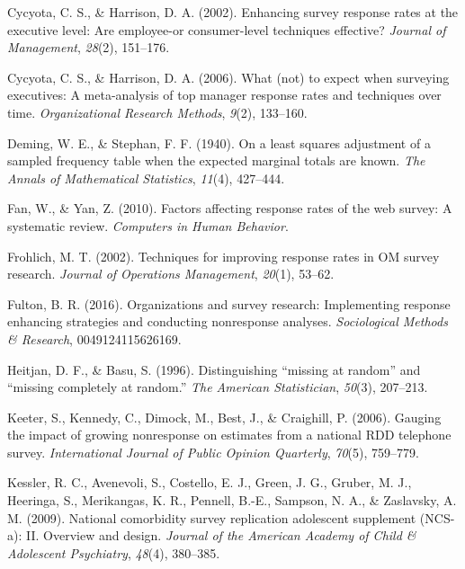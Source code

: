 \documentclass[
  man,mask]{apa7}
\newlength{\cslhangindent}
\newlength{\cslentryspacingunit} %
\newenvironment{CSLReferences}[2] %
 {%
  \setlength{\parindent}{0pt}
  \ifodd #1
  \let\oldpar\par
  \def\par{\hangindent=\cslhangindent\oldpar}
  \fi
  \setlength{\parskip}{#2\cslentryspacingunit}
 }%
 {}
\begin{document}
\begin{CSLReferences}{1}{0}
\leavevmode{}%
Cycyota, C. S., \& Harrison, D. A. (2002). Enhancing survey response rates at the executive level: Are employee-or consumer-level techniques effective? \emph{Journal of Management}, \emph{28}(2), 151--176.

\leavevmode{}%
Cycyota, C. S., \& Harrison, D. A. (2006). What (not) to expect when surveying executives: A meta-analysis of top manager response rates and techniques over time. \emph{Organizational Research Methods}, \emph{9}(2), 133--160.

\leavevmode{}%
Deming, W. E., \& Stephan, F. F. (1940). On a least squares adjustment of a sampled frequency table when the expected marginal totals are known. \emph{The Annals of Mathematical Statistics}, \emph{11}(4), 427--444.

\leavevmode{}%
Fan, W., \& Yan, Z. (2010). Factors affecting response rates of the web survey: A systematic review. \emph{Computers in Human Behavior}.

\leavevmode{}%
Frohlich, M. T. (2002). Techniques for improving response rates in {OM} survey research. \emph{Journal of Operations Management}, \emph{20}(1), 53--62.

\leavevmode{}%
Fulton, B. R. (2016). Organizations and survey research: Implementing response enhancing strategies and conducting nonresponse analyses. \emph{Sociological Methods \& Research}, 0049124115626169.

\leavevmode{}%
Heitjan, D. F., \& Basu, S. (1996). Distinguishing {``missing at random''} and {``missing completely at random.''} \emph{The American Statistician}, \emph{50}(3), 207--213.

\leavevmode{}%
Keeter, S., Kennedy, C., Dimock, M., Best, J., \& Craighill, P. (2006). Gauging the impact of growing nonresponse on estimates from a national {RDD} telephone survey. \emph{International Journal of Public Opinion Quarterly}, \emph{70}(5), 759--779.

\leavevmode{}%
Kessler, R. C., Avenevoli, S., Costello, E. J., Green, J. G., Gruber, M. J., Heeringa, S., Merikangas, K. R., Pennell, B.-E., Sampson, N. A., \& Zaslavsky, A. M. (2009). National comorbidity survey replication adolescent supplement ({NCS}-a): {II}. Overview and design. \emph{Journal of the American Academy of Child \& Adolescent Psychiatry}, \emph{48}(4), 380--385.


\end{CSLReferences}
\end{document}
